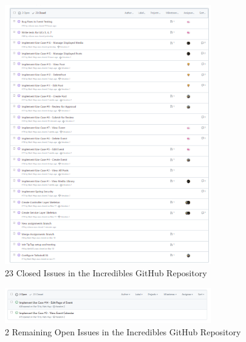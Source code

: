 \begin{figure}[H]
    \centering
    \includegraphics[width=0.8\textwidth]{images/ClosedIssues.png}
    \centering
    \caption{23 Closed Issues in the Incredibles GitHub Repository}
\end{figure}

\begin{figure}[H]
    \centering
    \includegraphics[width=0.8\textwidth]{images/OpenIssues.png}
    \centering
    \caption{2 Remaining Open Issues in the Incredibles GitHub Repository}
\end{figure}

